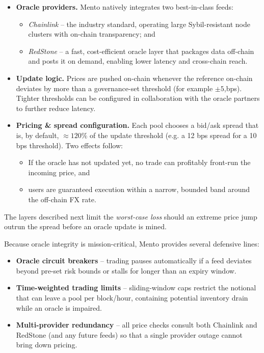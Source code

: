\documentclass[a4paper]{article}
\theoremstyle{definition}
\begin{document}
\begin{itemize}[leftmargin=*]
  \item \textbf{Oracle providers.}  Mento natively integrates two best-in-class feeds:\cite{chainlink_docs,redstone_docs}
    \begin{itemize}[leftmargin=*]
      \item \emph{Chainlink} – the industry standard, operating large Sybil-resistant node clusters with on-chain transparency; and
      \item \emph{RedStone} – a fast, cost-efficient oracle layer that packages data off-chain and posts it on demand, enabling lower latency and cross-chain reach.
    \end{itemize}
  \item \textbf{Update logic.}  Prices are pushed on-chain whenever the reference on-chain deviates by more than a governance-set threshold (for example $\pm5$,bps).  Tighter thresholds can be configured in collaboration with the oracle partners to further reduce latency.
  \item \textbf{Pricing \& spread configuration.}  Each pool chooses a bid/ask spread that is, by default, $\approx120\%$ of the update threshold (e.g. a 12 bps spread for a 10 bps threshold). Two effects follow:
        \begin{itemize}[leftmargin=*]
          \item If the oracle has not updated yet, no trade can profitably front-run the incoming price, and
          \item users are guaranteed execution within a narrow, bounded band around the off-chain FX rate.
        \end{itemize}
\end{itemize}

The layers described next limit the \emph{worst-case loss} should an extreme price jump outrun the spread before an oracle update is mined.

Because oracle integrity is mission-critical, Mento provides several defensive lines:

\begin{itemize}[leftmargin=*]
  \item \textbf{Oracle circuit breakers} – trading pauses automatically if a feed deviates beyond pre-set risk bounds or stalls for longer than an expiry window.
  \item \textbf{Time-weighted trading limits} – sliding-window caps restrict the notional that can leave a pool per block/hour, containing potential inventory drain while an oracle is impaired.
  \item \textbf{Multi-provider redundancy} – all price checks consult both Chainlink and RedStone (and any future feeds) so that a single provider outage cannot bring down pricing.
\end{itemize}
\end{document}

